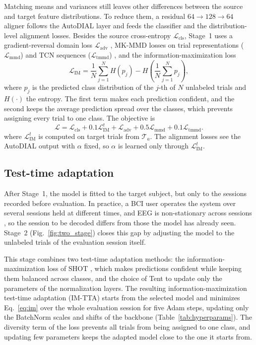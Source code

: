 \documentclass[preprint,12pt]{elsarticle}
\begin{document}
Matching means and variances still leaves other differences between the source and target feature distributions. To reduce them, a residual $64\!\rightarrow\!128\!\rightarrow\!64$ aligner follows the AutoDIAL layer and feeds the classifier and the distribution-level alignment losses. Besides the source cross-entropy $\mathcal{L}_{\mathrm{cls}}$, Stage~1 uses a gradient-reversal domain loss $\mathcal{L}_{\mathrm{adv}}$ \cite{ganin2016dann}, MK-MMD losses on trial representations ($\mathcal{L}_{\mathrm{mmd}}$) and TCN sequences ($\mathcal{L}_{\mathrm{tmmd}}$) \cite{long2015dan}, and the information-maximization loss \cite{liang2020shot}
\begin{equation}
    \mathcal{L}_{\mathrm{IM}}
    =\frac{1}{N}\sum_{j=1}^{N} H(p_j)-H\!\left(\frac{1}{N}\sum_{j=1}^{N}p_j\right),
\label{eq:im}
\end{equation}
where $p_j$ is the predicted class distribution of the $j$-th of $N$ unlabeled trials and $H(\cdot)$ the entropy. The first term makes each prediction confident, and the second keeps the average prediction spread over the classes, which prevents assigning every trial to one class. The objective is
\begin{equation}
    \mathcal{L}=\mathcal{L}_{\mathrm{cls}}+0.1\mathcal{L}_{\mathrm{IM}}^{t}+\mathcal{L}_{\mathrm{adv}}
    +0.5\mathcal{L}_{\mathrm{mmd}}+0.1\mathcal{L}_{\mathrm{tmmd}}.
\label{eq:total_loss}
\end{equation}
where $\mathcal{L}_{\mathrm{IM}}^{t}$ is computed on target trials from $\mathcal{T}_a$. The alignment losses see the AutoDIAL output with $\alpha$ fixed, so $\alpha$ is learned only through $\mathcal{L}_{\mathrm{IM}}^{t}$.

\subsection{Test-time adaptation}
\label{subsec:imtta}

After Stage~1, the model is fitted to the target subject, but only to the sessions recorded before evaluation. In practice, a BCI user operates the system over several sessions held at different times, and EEG is non-stationary across sessions \cite{pfurtscheller1999erd}, so the session to be decoded differs from those the model has already seen. Stage~2 (Fig.~\ref{fig:two_stage}) closes this gap by adjusting the model to the unlabeled trials of the evaluation session itself.

This stage combines two test-time adaptation methods: the information-maximization loss of SHOT \cite{liang2020shot}, which makes predictions confident while keeping them balanced across classes, and the choice of Tent \cite{wang2021tent} to update only the parameters of the normalization layers. The resulting information-maximization test-time adaptation (IM-TTA) starts from the selected model and minimizes Eq.~\eqref{eq:im} over the whole evaluation session for five Adam steps, updating only the BatchNorm scales and shifts of the backbone (Table~\ref{tab:hyperparams}). The diversity term of the loss prevents all trials from being assigned to one class, and updating few parameters keeps the adapted model close to the one it starts from.
\end{document}
